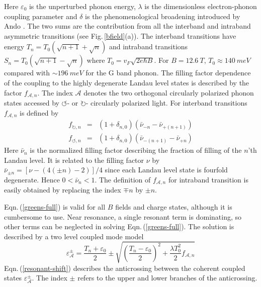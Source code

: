 \documentclass[prl,aps,superscriptaddress,showpacs,reprint]{revtex4-1}
\begin{document}
Here $\varepsilon_0$ is the unperturbed phonon energy, $\lambda$ is the dimensionless electron-phonon coupling parameter and $\delta$ is the phenomenological broadening introduced by Ando \cite{ando2007magnetic}. The two sums are the contribution from all the interband and intraband asymmetric transitions (see Fig.\,\ref{bfield}(a)). The interband transitions have energy $T_n=T_0\left(\sqrt{n+1}+\sqrt{n}\right)$ and intraband transitions $S_n=T_0\left(\sqrt{n+1}-\sqrt{n}\right)$ where $T_0=v_F\sqrt{2e\hbar B}$. For $B=12.6\: T$, $T_0 \approx 140\: meV$ compared with $\sim 196\: meV$ for the G band phonon.
The filling factor dependence of the coupling to the highly degenerate Landau level states is described by the factor $f_{\mathcal{A},n}$. The index $\mathcal{A}$ denotes the two orthogonal circularly polarized phonon states accessed by $\circlearrowleft$- or $\circlearrowright$- circularly polarized light. For interband transitions $f_{\mathcal{A},n}$ is defined by
\begin{eqnarray}
\label{fterm}
f_{\circlearrowright,n}&=&(1+\delta_{n,0})(\bar{\nu}_{-n}-\bar{\nu}_{+(n+1)})\nonumber\\
f_{\circlearrowleft,n}&=&(1+\delta_{n,0})(\bar{\nu}_{-(n+1)}-\bar{\nu}_{+n})
\end{eqnarray}
Here  $\bar{\nu}_{n} $ is the normalized  filling factor describing the fraction of filling of the $n$’th Landau level. It is related to the filling factor $\nu$ by $\bar{\nu}_{\pm n} = \left[\nu -(4(\pm n)-2)\right]/4$ since each Landau level state is fourfold degenerate.
Hence $0<\bar{\nu}_{n}<1$. The definition of $f_{\mathcal{A},n}$ for intraband transition is easily obtained by replacing the index $\mp n$ by $\pm n$.

Eqn.\,(\ref{greens-full}) is valid for all $B$ fields and charge states, although it is cumbersome to use. Near resonance, a single resonant term is dominating, so other terms can be neglected in solving Eqn.\,(\ref{greens-full}). The solution is described by a two level coupled mode model \cite{yan2010observation,PhysRevLett.110.227402}
\begin{equation}
\label{resonant-shift}
\varepsilon_{\mathcal{A}}^{\pm}=\frac{T_n+\varepsilon_0}{2}\pm\sqrt{\left(\frac{T_n-\varepsilon_0}{2}\right)^2+\frac{\lambda T_0^2}{2}f_{\mathcal{A},n}}
\end{equation}
Eqn.\,(\ref{resonant-shift}) describes the anticrossing between the coherent coupled states $\varepsilon_{\mathcal{A}}^{\pm}$. The index $\pm$ refers to the upper and lower branches of the anticrossing.
\end{document}
